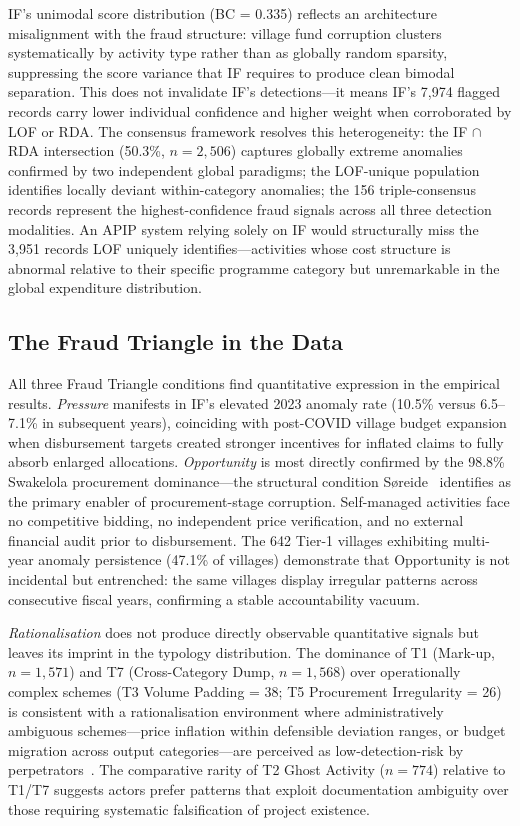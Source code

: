 \documentclass[3p,times,procedia]{elsarticle}
\begin{document}
IF's unimodal score distribution (BC = 0.335) reflects an architecture misalignment with the fraud structure: village fund corruption clusters systematically by activity type rather than as globally random sparsity, suppressing the score variance that IF requires to produce clean bimodal separation. This does not invalidate IF's detections---it means IF's 7,974 flagged records carry lower individual confidence and higher weight when corroborated by LOF or RDA. The consensus framework resolves this heterogeneity: the IF $\cap$ RDA intersection (50.3\%, $n = 2{,}506$) captures globally extreme anomalies confirmed by two independent global paradigms; the LOF-unique population identifies locally deviant within-category anomalies; the 156 triple-consensus records represent the highest-confidence fraud signals across all three detection modalities. An APIP system relying solely on IF would structurally miss the 3,951 records LOF uniquely identifies---activities whose cost structure is abnormal relative to their specific programme category but unremarkable in the global expenditure distribution.

\subsection{The Fraud Triangle in the Data}

All three Fraud Triangle conditions find quantitative expression in the empirical results. \textit{Pressure} manifests in IF's elevated 2023 anomaly rate (10.5\% versus 6.5--7.1\% in subsequent years), coinciding with post-COVID village budget expansion when disbursement targets created stronger incentives for inflated claims to fully absorb enlarged allocations. \textit{Opportunity} is most directly confirmed by the 98.8\% Swakelola procurement dominance---the structural condition S{\o}reide~\cite{ref9} identifies as the primary enabler of procurement-stage corruption. Self-managed activities face no competitive bidding, no independent price verification, and no external financial audit prior to disbursement. The 642 Tier-1 villages exhibiting multi-year anomaly persistence (47.1\% of villages) demonstrate that Opportunity is not incidental but entrenched: the same villages display irregular patterns across consecutive fiscal years, confirming a stable accountability vacuum.

\textit{Rationalisation} does not produce directly observable quantitative signals but leaves its imprint in the typology distribution. The dominance of T1 (Mark-up, $n = 1{,}571$) and T7 (Cross-Category Dump, $n = 1{,}568$) over operationally complex schemes (T3 Volume Padding = 38; T5 Procurement Irregularity = 26) is consistent with a rationalisation environment where administratively ambiguous schemes---price inflation within defensible deviation ranges, or budget migration across output categories---are perceived as low-detection-risk by perpetrators~\cite{ref17}. The comparative rarity of T2 Ghost Activity ($n = 774$) relative to T1/T7 suggests actors prefer patterns that exploit documentation ambiguity over those requiring systematic falsification of project existence.
\end{document}
